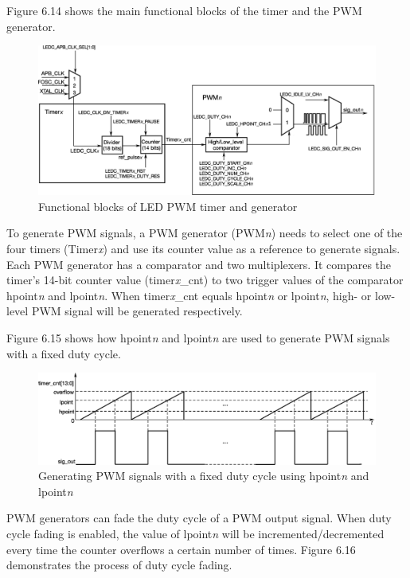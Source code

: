 \documentclass[a4paper,12pt,openany]{book}
\begin{document}
Figure 6.14 shows the main functional blocks of the timer and the PWM generator.

    \begin{figure}[h!]
    \centering
    \includegraphics[width=\textwidth]{D6Z/6-14}
    \caption{Functional blocks of LED PWM timer and generator}
    \end{figure}

To generate PWM signals, a PWM generator (PWM\textit{n}) needs to select one of the four timers (Timer\textit{x}) and use its counter value as a reference to generate signals. Each PWM generator has a comparator and two multiplexers. It compares the timer’s 14-bit counter value (timer\textit{x}\_cnt) to two trigger values of the comparator hpoint\textit{n} and lpoint\textit{n}. When timer\textit{x}\_cnt equals hpoint\textit{n} or lpoint\textit{n}, high- or low-level PWM signal will be generated respectively.

Figure 6.15 shows how hpoint\textit{n} and lpoint\textit{n} are used to generate PWM signals with a fixed duty cycle.

\begin{figure}[h!]
    \centering
    \includegraphics[width=\textwidth]{D6Z/6-15}
    \caption{Generating PWM signals with a fixed duty cycle using hpoint\textit{n} and lpoint\textit{n}}
\end{figure}

PWM generators can fade the duty cycle of a PWM output signal. When duty cycle fading is enabled, the value of lpoint\textit{n} will be incremented/decremented every time the counter overflows a certain number of times. Figure 6.16 demonstrates the process of duty cycle fading.
\end{document}
